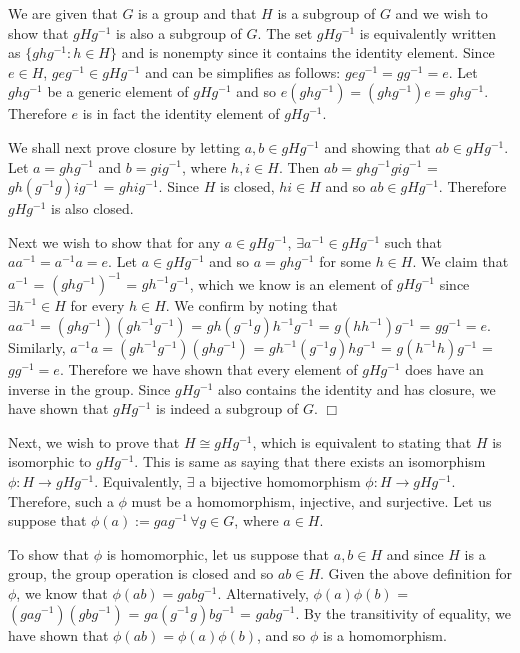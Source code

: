 \documentclass[12pt,letterpaper,reqno]{amsart}
\begin{document}
\begin{enumerate}
\begin{flushleft}
We are given that $G$ is a group and that $H$ is a subgroup of $G$ and we wish to show that $gHg^{-1}$ is also a subgroup of $G$. The set $gHg^{-1}$ is equivalently written as $\{ghg^{-1} : h \in H\}$ and is nonempty since it contains the identity element. Since $e \in H$, $geg^{-1} \in gHg^{-1}$ and can be simplifies as follows: $geg^{-1} = gg^{-1} = e$. Let $ghg^{-1}$ be a generic element of $gHg^{-1}$ and so $e(ghg^{-1}) = (ghg^{-1})e = ghg^{-1}$. Therefore $e$ is in fact the identity element of $gHg^{-1}$.
\newline

We shall next prove closure by letting $a, b \in gHg^{-1}$ and showing that $ab \in gHg^{-1}$. Let $a = ghg^{-1}$ and $b = gig^{-1}$, where $h, i \in H$. Then $ab = ghg^{-1}gig^{-1}$ = $gh(g^{-1}g)ig^{-1}$ = $ghig^{-1}$. Since $H$ is closed, $hi \in H$ and so $ab \in gHg^{-1}$. Therefore $gHg^{-1}$ is also closed.
\newline

Next we wish to show that for any $a \in gHg^{-1}$, $\exists a^{-1} \in gHg^{-1}$ such that $aa^{-1} = a^{-1}a = e$. Let $a \in gHg^{-1}$ and so $a = ghg^{-1}$ for some $h \in H$. We claim that $a^{-1}$ = $( ghg^{-1})^{-1}$ = $gh^{-1}g^{-1}$, which we know is an element of $gHg^{-1}$ since $\exists h^{-1} \in H$ for every $h \in H$. We confirm by noting that $aa^{-1} = (ghg^{-1})(gh^{-1}g^{-1})$ = $gh(g^{-1}g)h^{-1}g^{-1}$ = $g(hh^{-1})g^{-1}$ = $gg^{-1} = e$. Similarly, $a^{-1}a = (gh^{-1}g^{-1})(ghg^{-1})$ = $gh^{-1}(g^{-1}g)hg^{-1}$ = $g(h^{-1}h)g^{-1}$ = $gg^{-1} = e$. Therefore we have shown that every element of $gHg^{-1}$ does have an inverse in the group. Since $gHg^{-1}$ also contains the identity and has closure, we have shown that $gHg^{-1}$ is indeed a subgroup of $G$. $\Box$
\newline

Next, we wish to prove that $H \cong gHg^{-1}$, which is equivalent to stating that $H$ is isomorphic to $gHg^{-1}$. This is same as saying that there exists an isomorphism $\phi: H \rightarrow gHg^{-1}$. Equivalently, $\exists$ a bijective homomorphism $\phi: H \rightarrow gHg^{-1}$. Therefore, such a $\phi$ must be a homomorphism, injective, and surjective. Let us suppose that $\phi(a) := gag^{-1}\, \forall g \in G$, where $a \in H$.
\newline

To show that $\phi$ is homomorphic, let us suppose that $a, b \in H$ and since $H$ is a group, the group operation is closed and so $ab \in H$. Given the above definition for $\phi$, we know that $\phi(ab) = gabg^{-1}$. Alternatively, $\phi(a)\phi(b)$ = $(gag^{-1})(gbg^{-1})$ = $ga(g^{-1}g)bg^{-1}$ = $gabg^{-1}$. By the transitivity of equality, we have shown that $\phi(ab) = \phi(a)\phi(b)$, and so $\phi$ is a homomorphism.
\newline


\end{flushleft}
\end{enumerate}
\end{document}
